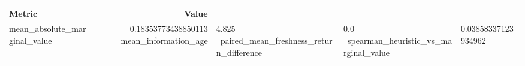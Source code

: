 \begin{tabular}{lr}
\hline
Metric & Value \\
\hline
mean\_absolute\_marginal\_value & 0.18353773438850113 \
mean\_information\_age & 4.825 \
paired\_mean\_freshness\_return\_difference & 0.0 \
spearman\_heuristic\_vs\_marginal\_value & 0.03858337123934962 \
\hline
\end{tabular}
